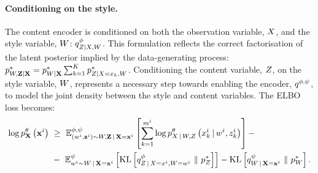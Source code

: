 \documentclass[../thesis.tex]{subfiles}
\begin{document}
\paragraph{Conditioning on the style.} The content encoder is conditioned on both the observation variable, $\myrv{x}$, and the style variable, $\myrv{w}$: $\myfunc{q}^{\phi}_{\myrv{z} | \myrv{x}, \myrv{w}}$. This formulation reflects the correct factorisation of the latent posterior implied by the data-generating process: $\myfunc{p}^{*}_{\myrv{w}, \mygroup{\myrv{z}} | \mygroup{\myrv{x}}} = \myfunc{p}^{*}_{\myrv{w} | \mygroup{\myrv{x}}} \sum_{k=1}^{\myrv{K}} \myfunc{p}^{*}_{\myrv{z} | \myrv{x} = \myvect{x}_k, \myrv{w}}$. Conditioning the content variable, $\myrv{z}$, on the style variable, $\myrv{w}$, represents a necessary step towards enabling the encoder, $q^{\phi, \psi}$, to model the joint density between the style and content variables. The ELBO loss becomes:
\begin{align}
\begin{split}
      \log \myfunc{p}^{\theta}_{\mygroup{\myrv{x}}} \left( \mygroup{\myvect{x}}^i \right) ~&\geq~ \mathbb{E}^{\phi, \psi}_{(\myvect{w}^i, \mygroup{\myvect{z}}^i) \sim \myrv{w}, \mygroup{\myrv{z}} \,|\, \mygroup{\myrv{x}} = \mygroup{\myvect{x}}^i} \left[\sum_{k=1}^{\mycnt{m}^i} \log \myfunc{p}^{\theta}_{\myrv{x} \,|\, \myrv{w}, \myrv{z}} \left( \myvect{x}^i_k \,|\, \myvect{w}^i, \myvect{z}^i_k \right) \right] - \\ 
      &-~ \mathbb{E}^{\psi}_{\myvect{w}^i \sim \myrv{w} \,|\, \mygroup{\myrv{x}} = \mygroup{\myvect{x}}^i} \left[ \mathrm{KL} \left[ \myfunc{q}^{\phi}_{\myrv{z} \,|\, \myrv{x} = \myvect{x}^i, \myrv{w} = \myvect{w}^i} ~\|~ \myfunc{p}^{*}_{\myrv{z}} \right] \right] - \mathrm{KL} \left[ \myfunc{q}^{\psi}_{\myrv{w} \,|\, \mygroup{\myrv{x}} = \mygroup{\myvect{x}}^i} ~\|~ \myfunc{p}^{*}_{\myrv{w}} \right].
\label{eq:cxvae_elbo}
\end{split}
\end{align}


\end{document}
